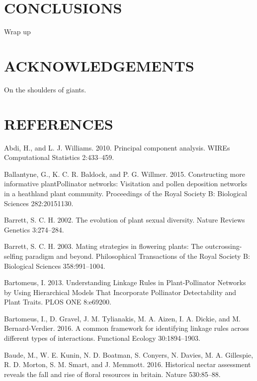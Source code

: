 \documentclass[12pt,a4paper,]{article}
\begin{document}
\section{CONCLUSIONS}\label{conclusions}

Wrap up

\section{ACKNOWLEDGEMENTS}\label{acknowledgements}

On the shoulders of giants.

\section{REFERENCES}\label{references}

\hypertarget{refs}{}
\hypertarget{ref-abdi2010}{}
Abdi, H., and L. J. Williams. 2010. Principal component analysis. WIREs
Computational Statistics 2:433--459.

\hypertarget{ref-ballantyne2015}{}
Ballantyne, G., K. C. R. Baldock, and P. G. Willmer. 2015. Constructing
more informative plantPollinator networks: Visitation and pollen
deposition networks in a heathland plant community. Proceedings of the
Royal Society B: Biological Sciences 282:20151130.

\hypertarget{ref-barrett2002}{}
Barrett, S. C. H. 2002. The evolution of plant sexual diversity. Nature
Reviews Genetics 3:274--284.

\hypertarget{ref-barrett2003}{}
Barrett, S. C. H. 2003. Mating strategies in flowering plants: The
outcrossing-selfing paradigm and beyond. Philosophical Transactions of
the Royal Society B: Biological Sciences 358:991--1004.

\hypertarget{ref-bartomeus2013}{}
Bartomeus, I. 2013. Understanding Linkage Rules in Plant-Pollinator
Networks by Using Hierarchical Models That Incorporate Pollinator
Detectability and Plant Traits. PLOS ONE 8:e69200.

\hypertarget{ref-bartomeus2016}{}
Bartomeus, I., D. Gravel, J. M. Tylianakis, M. A. Aizen, I. A. Dickie,
and M. Bernard-Verdier. 2016. A common framework for identifying linkage
rules across different types of interactions. Functional Ecology
30:1894--1903.

\hypertarget{ref-baude2016}{}
Baude, M., W. E. Kunin, N. D. Boatman, S. Conyers, N. Davies, M. A.
Gillespie, R. D. Morton, S. M. Smart, and J. Memmott. 2016. Historical
nectar assessment reveals the fall and rise of floral resources in
britain. Nature 530:85--88.
\end{document}
